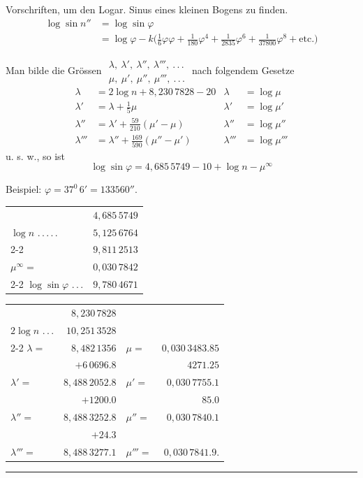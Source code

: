 Vorschriften, um den Logar. Sinus eines kleinen Bogens zu finden.
\[
\begin{aligned}
\log\sin n''&=\log\sin\varphi\\
&=\log\varphi-k\bigl(\tfrac16\varphi\varphi+\tfrac1{180}\varphi^4+\tfrac1{2835}\varphi^6+\tfrac1{37800}\varphi^8+\text{etc.}\bigr)
\end{aligned}
\]

Man bilde die Grössen \(\begin{smallmatrix}\lambda,\ \lambda',\ \lambda'',\ \lambda''',\ .\,.\,.\\\mu,\ \mu',\ \mu'',\ \mu''',\ .\,.\,.\end{smallmatrix}\) nach folgendem Gesetze
\[
\begin{aligned}
\lambda&=2\log n+8{,}230\,7828-20&\lambda&=\log\mu\\
\lambda'&=\lambda+\tfrac15\mu&\lambda'&=\log\mu'\\
\lambda''&=\lambda'+\tfrac{59}{210}(\mu'-\mu)&\lambda''&=\log\mu''\\
\lambda'''&=\lambda''+\tfrac{169}{590}(\mu''-\mu')&\lambda'''&=\log\mu'''
\end{aligned}
\]
\noindent u. s. w.,
so ist
\[
\log\sin\varphi=4{,}685\,5749-10+\log n-\mu^{\infty}
\]

Beispiel: \(\varphi=37^0\,6'=133560''\).
\begin{center}
\begin{tabular}{@{}lr@{}}
&\(4{,}685\,5749\)\\
\(\log n\) .\,.\,.\,.\,.&\(5{,}125\,6764\)\\
\cline{2-2}
&\(9{,}811\,2513\)\\
\(\mu^{\infty}=\)&\(0{,}030\,7842\)\\
\cline{2-2}
\(\log\sin\varphi\) .\,.\,.&\(9{,}780\,4671\)
\end{tabular}
\end{center}
\begin{center}
\begin{tabular}{@{}lr@{\qquad}lr@{}}
&\(8{,}230\,7828\)&&\\
\(2\log n\) .\,.\,.&\(10{,}251\,3528\)&&\\
\cline{2-2}
\(\lambda=\)&\(8{,}482\,1356\)&\(\mu=\)&\(0{,}030\,3483.85\)\\
&\(+6\,0696.8\)&&\(4271.25\)\\
\(\lambda'=\)&\(8{,}488\,2052.8\)&\(\mu'=\)&\(0{,}030\,7755.1\)\\
&\(+1200.0\)&&\(85.0\)\\
\(\lambda''=\)&\(8{,}488\,3252.8\)&\(\mu''=\)&\(0{,}030\,7840.1\)\\
&\(+24.3\)&&\\
\(\lambda'''=\)&\(8{,}488\,3277.1\)&\(\mu'''=\)&\(0{,}030\,7841.9\).
\end{tabular}
\end{center}
\begin{center}\rule{.18\textwidth}{.35pt}\end{center}
